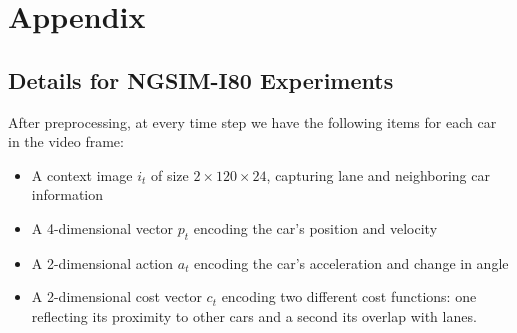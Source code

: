 \documentclass{article}
\begin{document}
%
%
%
%
%
%


\section{Appendix}


\subsection{Details for NGSIM-I80 Experiments}

After preprocessing, at every time step we have the following items for each car in the video frame:


\begin{itemize}
\item A context image $i_t$ of size $2 \times 120 \times 24$, capturing lane and neighboring car information
\item A 4-dimensional vector $p_t$ encoding the car's position and velocity
\item A 2-dimensional action $a_t$ encoding the car's acceleration and change in angle
\item A 2-dimensional cost vector $c_t$ encoding two different cost functions: one reflecting its proximity to other cars and a second its overlap with lanes.
\end{itemize}
\end{document}
